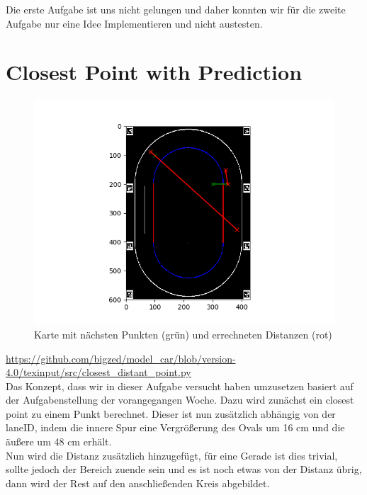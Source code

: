 \documentclass[10pt,oneside,a4paper]{article}
\begin{document}
	Die erste Aufgabe ist uns nicht gelungen und daher konnten wir für die zweite Aufgabe
    nur eine Idee Implementieren und nicht austesten.
  \section{Closest Point with Prediction}
    \begin{figure}[h]
      \centering
      \includegraphics[scale=0.7]{pictures/ass10_1.png}
      \caption{Karte mit nächsten Punkten (grün) und errechneten Distanzen (rot)}
    \end{figure}
    \url{https://github.com/bigzed/model_car/blob/version-4.0/texinput/src/closest_distant_point.py} \\
    Das Konzept, dass wir in dieser Aufgabe versucht haben umzusetzen basiert auf
    der Aufgabenstellung der vorangegangen Woche. Dazu wird zunächst ein closest point
    zu einem Punkt berechnet. Dieser ist nun zusätzlich abhängig von der laneID, indem
    die innere Spur eine Vergrößerung des Ovals um 16 cm und die äußere um 48 cm erhält. \\
	
	Nun wird die Distanz zusätzlich hinzugefügt, für eine Gerade ist dies trivial, sollte
	jedoch der Bereich zuende sein und es ist noch etwas von der Distanz übrig, dann
	wird der Rest auf den anschließenden Kreis abgebildet. \\
	
\end{document}
